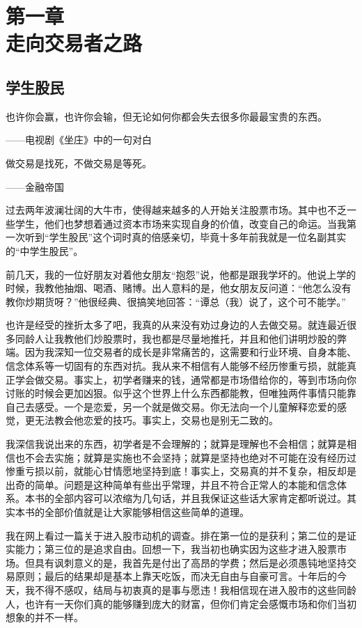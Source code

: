 \section[第一章\q 走向交易者之路]{第一章\\ 走向交易者之路}

\subsection{学生股民}

{\kaishu
也许你会赢，也许你会输，但无论如何你都会失去很多你最最宝贵的东西。

\hfill ——电视剧《坐庄》中的一句对白

做交易是找死，不做交易是等死。

\hfill ——金融帝国
}

过去两年波澜壮阔的大牛市，使得越来越多的人开始关注股票市场。其中也不乏一些学生，他们也梦想着通过资本市场来实现自身的价值，改变自己的命运。当我第一次听到“学生股民”这个词时真的倍感亲切，毕竟十多年前我就是一位名副其实的“中学生股民”。

前几天，我的一位好朋友对着他女朋友“抱怨”说，他都是跟我学坏的。他说上学的时候，我教他抽烟、喝酒、赌博。出人意料的是，他女朋友反问道：“他怎么没有教你炒期货呀？”他很经典、很搞笑地回答：“谭总（我）说了，这个可不能学。”

也许是经受的挫折太多了吧，我真的从来没有劝过身边的人去做交易。就连最近很多同龄人让我教他们炒股票时，我也都是尽量地推托，并且和他们讲明炒股的弊端。因为我深知一位交易者的成长是非常痛苦的，这需要和行业环境、自身本能、信念体系等一切固有的东西对抗。我从来不相信有人能够不经历惨重亏损，就能真正学会做交易。事实上，初学者赚来的钱，通常都是市场借给你的，等到市场向你讨账的时候会更加凶狠。似乎这个世界上什么东西都能教，但唯独两件事情只能靠自己去感受。一个是恋爱，另一个就是做交易。你无法向一个儿童解释恋爱的感觉，更无法教会他恋爱的技巧。事实上，交易也是别无二致的。

我深信我说出来的东西，初学者是不会理解的；就算是理解也不会相信；就算是相信也不会去实施；就算是实施也不会坚持；就算是坚持也绝对不可能在没有经历过惨重亏损以前，就能心甘情愿地坚持到底！事实上，交易真的并不复杂，相反却是出奇的简单。问题是这种简单有些出乎常理，并且不符合正常人的本能和信念体系。本书的全部内容可以浓缩为几句话，并且我保证这些话大家肯定都听说过。其实本书的全部价值就是让大家能够相信这些简单的道理。

我在网上看过一篇关于进入股市动机的调查。排在第一位的是获利；第二位的是证实能力；第三位的是追求自由。回想一下，我当初也确实因为这些才进入股票市场。但具有讽刺意义的是，我首先是付出了高昂的学费；然后是必须愚钝地坚持交易原则；最后的结果却是基本上靠天吃饭，而决无自由与自豪可言。十年后的今天，我不得不感叹，结局与初衷真的是事与愿违！我相信现在进入股市的这些同龄人，也许有一天你们真的能够赚到庞大的财富，但你们肯定会感慨市场和你们当初想象的并不一样。

